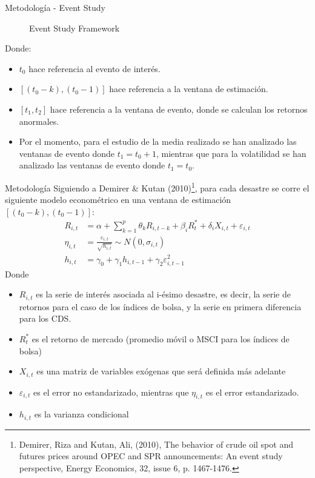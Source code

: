 \documentclass{beamer}
\begin{document}
\begin{frame}{Metodología - Event Study}
\begin{figure}
    \centering
    \caption{Event Study Framework}
    \label{fig:event}
\end{figure}
Donde: 
\begin{itemize}
    \item $t_0$ hace referencia al evento de interés.
    \item $[(t_0-k),(t_0-1)]$ hace referencia a la ventana de estimación.
    \item $[t_1,t_2]$ hace referencia a la ventana de evento, donde se calculan los retornos anormales. 
    \item Por el momento, para el estudio de la media realizado se han analizado las ventanas de evento donde $t_1 = t_0 + 1$, mientras que para la volatilidad se han analizado las ventanas de evento donde $t_1 = t_0$.
\end{itemize}
\end{frame}

\begin{frame}{Metodología}
\footnotesize
Siguiendo a Demirer \& Kutan (2010)\footnote{Demirer, Riza and Kutan, Ali, (2010), The behavior of crude oil spot and futures prices around OPEC and SPR announcements: An event study perspective, Energy Economics, 32, issue 6, p. 1467-1476.}, para cada desastre se corre el siguiente modelo econométrico en una ventana de estimación $[(t_0-k),(t_0-1)]$:
\begin{align}
    R_{i,t} &= \alpha +\sum_{k=1}^{p} \theta_k R_{i,t-k} +\beta_iR_t^* + \delta_iX_{i,t} + \varepsilon_{i,t} \label{rit} \\
    \eta_{i,t} &= \frac{\varepsilon_{i,t}}{\sqrt{h_{i,t}}} \sim N(0,\sigma_{i,t})  \label{epsilon}\\
    h_{i,t} &= \gamma_0+ \gamma_1 h_{i,t-1}+\gamma_2 \varepsilon_{i,t-1}^2 \label{hit}
\end{align}
Donde
\begin{itemize}
    \item $R_{i,t}$ es la serie de interés asociada al i-ésimo desastre, es decir, la serie de retornos para el caso de los índices de bolsa, y la serie en primera diferencia para los CDS.
    \item $R_t^*$ es el retorno de mercado (promedio móvil o MSCI para los índices de bolsa)
    \item $X_{i,t}$ es una matriz de variables exógenas que será definida más adelante
    \item $\varepsilon_{i,t}$ es el error no estandarizado, mientras que $\eta_{i,t}$ es el error estandarizado.
    \item $h_{i,t}$ es la varianza condicional   
\end{itemize}
\end{frame}
\end{document}
